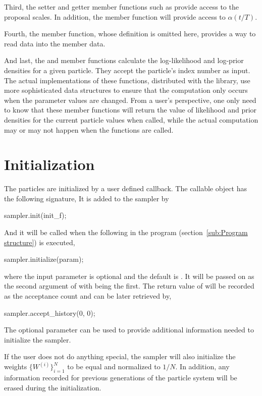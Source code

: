 Third, the setter and getter member functions such as 
provide access to the proposal scales. In addition, the member function
 will provide access to $\alpha(t/T)$.

Fourth, the  member function, whose definition is omitted
here, provides a way to read data into the  member data.

And last, the  and  member
functions calculate the log-likelihood and log-prior densities for a given
particle. They accept the particle's index number as input. The actual
implementations of these functions, distributed with the library, use more
sophisticated data structures to ensure that the computation only occurs when
the parameter values are changed. From a user's perspective, one only need to
know that these member functions will return the value of likelihood and prior
densities for the current particle values when called, while the actual
computation may or may not happen when the functions are called.

\section{Initialization}
\label{sec:Initialization}

The particles are initialized by a user defined callback. The callable object
has the following signature,
It is added to the sampler by
\begin{cppcode}
sampler.init(init_f);
\end{cppcode}
And it will be called when the following in the program
(section~\ref{sub:Program structure}) is executed,
\begin{cppcode}
sampler.initialize(param);
\end{cppcode}
where the input parameter  is optional and the default is
. It will be passed on as the second argument of
 with  being the first. The
return value of  will be recorded as the acceptance count
and can be later retrieved by,
\begin{cppcode}
sampler.accept_history(0, 0);
\end{cppcode}
The optional parameter can be used to provide additional information needed to
initialize the sampler.

If the user does not do anything special, the sampler will also initialize the
weights $\{W^{(i)}\}_{i=1}^N$ to be equal and normalized to $1/N$. In
addition, any information recorded for previous generations of the particle
system will be erased during the initialization.

